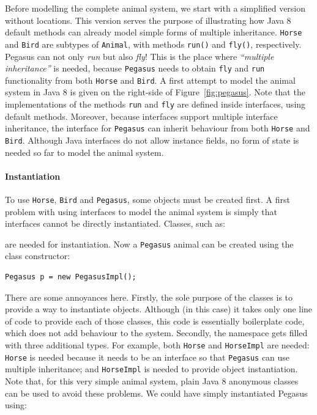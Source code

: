 Before modelling the complete animal system, we  start with a
simplified version without locations. This version serves the purpose of illustrating how
Java 8 default methods can already model simple forms of multiple inheritance.
\texttt{Horse} and \texttt{Bird} are subtypes
of \texttt{Animal}, with methods \texttt{run()} and \texttt{fly()},
respectively. Pegasus can not only \emph{run} but also \emph{fly}! This is the
place where \emph{``multiple inheritance''} is needed, because
\texttt{Pegasus} needs to obtain \texttt{fly} and \texttt{run}
functionality from both \texttt{Horse} and \texttt{Bird}.
A first attempt to model the animal system in Java 8 is given on the right-side
of Figure~\ref{fig:pegasus}.
Note that the implementations of the methods \texttt{run}
and \texttt{fly} are defined inside interfaces, using default
methods. Moreover, because interfaces support multiple interface
inheritance, the interface for \texttt{Pegasus} can inherit behaviour
from both \texttt{Horse} and \texttt{Bird}. Although Java interfaces
do not allow instance fields, no form of state is needed so far to
model the animal system.

\paragraph{Instantiation}
To use \texttt{Horse}, \texttt{Bird} and \texttt{Pegasus}, some
objects must be created first. A first problem with using
interfaces to model the animal system is simply that interfaces
cannot be directly instantiated. Classes, such as:


\noindent are needed for instantiation. Now a \texttt{Pegasus} animal can be created
using the class constructor:

\begin{lstlisting}
Pegasus p = new PegasusImpl();
\end{lstlisting}

\noindent There are some annoyances here. Firstly, the sole
purpose of the classes is to provide a way to instantiate
objects. Although (in this case) it takes only one line of code to
provide each of those classes, this code is essentially boilerplate
code, which does not add behaviour to the system. Secondly,
the namespace gets filled with three additional types. For example,
both \texttt{Horse} and \texttt{HorseImpl} are needed: \texttt{Horse}
is needed because it needs to be an interface so that \texttt{Pegasus}
can use multiple inheritance; and \texttt{HorseImpl} is needed to
provide object instantiation.
Note that, for this very simple animal system, plain Java 8 anonymous
classes can be used to avoid these problems.  We could have simply
instantiated Pegasus using:

